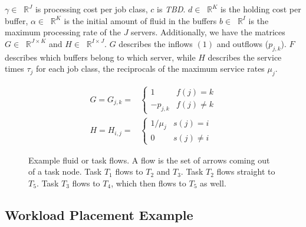 \documentclass[11pt,a4paper,titlepage]{article}
\newcommand*{\RR}[1]{\ensuremath{\mathop{}\!\mathbb{R}^{#1}}}%
\newcommand\tbd{{\color{orange}\textit{TBD}}}
\theoremstyle{definition}
\begin{document}
$\gamma \in \RR{J}$ is processing cost per job class,
$c$ is \tbd.
$d \in \RR{K}$ is the holding cost per buffer,
$\alpha \in \RR{K}$ is the initial amount of fluid in the buffers
$b \in \RR{I}$ is the maximum processing rate of the $J$ servers.
Additionally,
we have the matrices $G \in \RR{J \times K}$ and $H \in \RR{I \times J}$.
$G$ describes the inflows $(1)$ and outflows ($p_{j,k}$).
$F$ describes which buffers belong to which server,
while $H$ describes the service times $\tau_j$ for each job class,
the reciprocals of the maximum service rates $\mu_j$.

\begin{align}
    G = G_{j,k} = &
    \begin{cases}
        1 & f(j) = k \\
        -p_{j,k} & f(j) \neq k
    \end{cases} \\
    H = H_{i,j} = &
\begin{cases}
    1/\mu_j & s(j) = i \\
    0 & s(j) \neq i
\end{cases}
\end{align}

\begin{figure}
    \centering
    \caption[Example fluid or task flows.]{
        \label{fig:task-flows}
        Example fluid or task flows.
        A flow is the set of arrows coming out of a task node.
        Task $T_1$ flows to $T_2$ and $T_3$.
        Task $T_2$ flows straight to $T_5$.
        Task $T_3$ flows to $T_4$,
        which then flows to $T_5$ as well.
    }
\end{figure}


\subsection{Workload Placement Example}
\label{subseq:theory:workload-placement}
\end{document}
